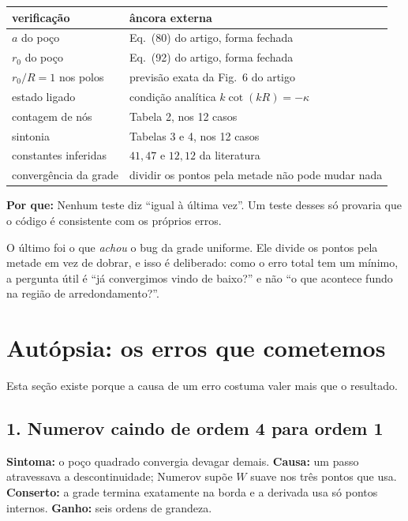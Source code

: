 \documentclass[11pt,a4paper]{article}
\newcommand{\pq}[1]{\medskip\noindent\textbf{Por que:} #1\medskip}
\begin{document}
\begin{center}
\begin{tabular}{lp{8.4cm}}
\toprule
\textbf{verificação} & \textbf{âncora externa} \\
\midrule
$a$ do poço & Eq.~(80) do artigo, forma fechada \\
$r_0$ do poço & Eq.~(92) do artigo, forma fechada \\
$r_0/R = 1$ nos polos & previsão exata da Fig.~6 do artigo \\
estado ligado & condição analítica $k\cot(kR) = -\kappa$ \\
contagem de nós & Tabela 2, nos 12 casos \\
sintonia & Tabelas 3 e 4, nos 12 casos \\
constantes inferidas & $41{,}47$ e $12{,}12$ da literatura \\
convergência da grade & dividir os pontos pela metade não pode mudar nada \\
\bottomrule
\end{tabular}
\end{center}

\pq{Nenhum teste diz ``igual à última vez''. Um teste desses só provaria que o
código é consistente com os próprios erros.}

O último foi o que \emph{achou} o bug da grade uniforme. Ele divide os pontos
pela metade em vez de dobrar, e isso é deliberado: como o erro total tem um
mínimo, a pergunta útil é ``já convergimos vindo de baixo?'' e não ``o que
acontece fundo na região de arredondamento?''.

\section{Autópsia: os erros que cometemos}
\label{sec:autopsia}

Esta seção existe porque a causa de um erro costuma valer mais que o resultado.

\subsection*{1. Numerov caindo de ordem 4 para ordem 1}
\textbf{Sintoma:} o poço quadrado convergia devagar demais.
\textbf{Causa:} um passo atravessava a descontinuidade; Numerov supõe $W$ suave
nos três pontos que usa. \textbf{Conserto:} a grade termina exatamente na borda
e a derivada usa só pontos internos. \textbf{Ganho:} seis ordens de grandeza.
\end{document}
